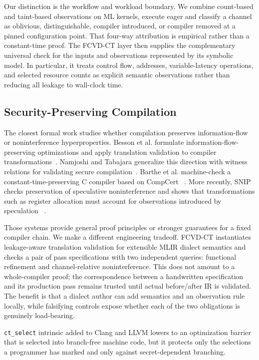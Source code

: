 Our distinction is the workflow and workload boundary.
We combine count-based and taint-based observations on ML kernels, execute eager and classify a channel as oblivious, distinguishable, compiler introduced, or compiler removed at a pinned configuration point.
That four-way attribution is empirical rather than a constant-time proof.
The FCVD-CT layer then supplies the complementary universal check for the inputs and observations represented by its symbolic model.
In particular, it treats control flow, addresses, variable-latency operations, and selected resource counts as explicit semantic observations rather than reducing all leakage to wall-clock time.

\subsection{Security-Preserving Compilation}

The closest formal work studies whether compilation preserves information-flow or noninterference hyperproperties.
Besson et al. formulate information-flow-preserving optimizations and apply translation validation to compiler transformations~\cite{besson2019ifpreservation}.
Namjoshi and Tabajara generalize this direction with witness relations for validating secure compilation~\cite{namjoshi2020witnessing}.
Barthe et al. machine-check a constant-time-preserving C compiler based on CompCert ~\cite{barthe2020ctcompiler}.
More recently, SNIP checks preservation of speculative noninterference and shows that transformations such as register allocation must account for observations introduced by speculation ~\cite{vanderwall2025snip}.

Those systems provide general proof principles or stronger guarantees for a fixed compiler chain.
We make a different engineering tradeoff.
FCVD-CT instantiates leakage-aware translation validation for extensible MLIR dialect semantics and checks a pair of pass specifications with two independent queries: functional refinement and channel-relative noninterference.
This does not amount to a whole-compiler proof; the correspondence between a handwritten specification and its production pass remains trusted until actual before/after IR is validated.
The benefit is that a dialect author can add semantics and an observation rule locally, while falsifying controls expose whether each of the two obligations is genuinely load-bearing.

\texttt{ct\_select} intrinsic added to Clang and LLVM lowers to an optimization barrier that is selected into branch-free machine code, but it protects only the selections a programmer has marked and only against secret-dependent branching.

